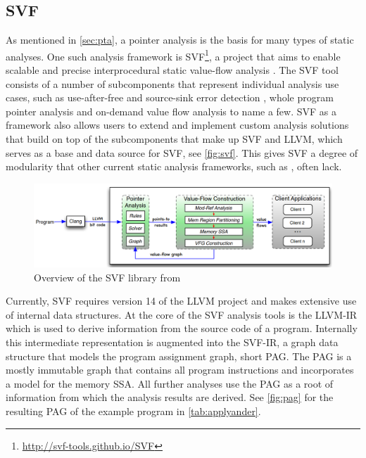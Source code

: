 \subsection{SVF}\label{sec:svf}
As mentioned in \autoref{sec:pta}, a pointer analysis is the basis for many types of static analyses.
One such analysis framework is SVF\footnote{\url{http://svf-tools.github.io/SVF}}, a project that aims to enable scalable and precise interprocedural static value-flow analysis \cite{sui2016svf}. The SVF tool consists of a number of subcomponents that represent individual analysis use cases, such as use-after-free and source-sink error detection \cite{sui2014detecting}, whole program pointer analysis and on-demand value flow analysis \cite{sui2018value} to name a few.
SVF as a framework also allows users to extend and implement custom analysis solutions that build on top of the subcomponents that make up SVF and LLVM, which serves as a base and data source for SVF, see \autoref{fig:svf}.
This gives SVF a degree of modularity that other current static analysis frameworks, such as \cite{shi2018pinpoint}, often lack.

\begin{figure}
    \centering
    \includegraphics[width=1.\textwidth]{img/svf.png}
    \caption[Overview of the SVF library]{Overview of the SVF library from \cite{sui2016svf}}
    \label{fig:svf}
\end{figure}

Currently, SVF requires version 14 of the LLVM project and makes extensive use of internal data structures.
At the core of the SVF analysis tools is the LLVM-IR which is used to derive information from the source code of a program. Internally this intermediate representation is augmented into the SVF-IR, a graph data structure that models the program assignment graph, short PAG. The PAG is a mostly immutable graph that contains all program instructions and incorporates a model for the memory SSA. All further analyses use the PAG as a root of information from which the analysis results are derived.
See \autoref{fig:pag} for the resulting PAG of the example program in \autoref{tab:applyander}.

